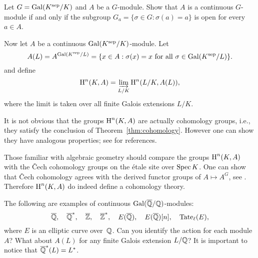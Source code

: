 \begin{exercise}
	Let $G = \operatorname{Gal}(K^{\operatorname{sep}}/K)$ and $A$ be a $G$-module.
	Show that $A$ is a continuous $G$-module
	if and only if the subgroup
	$G_a = \{\sigma \in G : \sigma(a) = a\}$ is open
	for every $a\in A$.
\end{exercise}

Now let $A$ be a continuous $\operatorname{Gal}(K^{\operatorname{sep}}/K)$-module. Let
$$
	A(L) = A^{\operatorname{Gal}(K^{\operatorname{sep}}/L)} = \{x \in A : \sigma(x) = x
	\text{ for all } \sigma \in\operatorname{Gal}(K^{\operatorname{sep}}/L)\}.
$$
and define
$$
	\operatorname{H}^n(K,A) = \varinjlim_{L/K} \operatorname{H}^n(L/K,A(L)),
$$
where the limit is taken over all finite Galois
extensions $L/K$.

It is not obvious that the groups $\operatorname{H}^n(K,A)$ are
actually cohomology groups, i.e., they satisfy the
conclusion of Theorem~\ref{thm:cohomology}. However
one can show they have analogous properties; see
\cite[Ch.~X.3]{serre:localfields} for references.

\begin{remark}
	Those familiar with algebraic geometry should
	compare the groups $\operatorname{H}^n(K,A)$ with the \v{C}ech
	cohomology groups on the \'{e}tale site over $\operatorname{Spec} K$.
	One can show that \v{C}ech cohomology
	agrees with the derived functor groups of
	$A\mapsto A^G$, see \cite[Ch.~10]{milne:etale}.
	Therefore $\operatorname{H}^n(K,A)$ do indeed define a cohomology
	theory.
\end{remark}

\begin{example}
The following are examples of continuous $\operatorname{Gal}(\overline{\mathbb{Q}}/\mathbb{Q})$-modules:
$$
	\overline{\mathbb{Q}},
	\quad \overline{\mathbb{Q}}^*,
	\quad \overline{\mathbb{Z}},
	\quad \overline{\mathbb{Z}}^*,
	\quad E(\overline{\mathbb{Q}}),
	\quad E(\overline{\mathbb{Q}})[n],
	\quad {\rm Tate}_{\ell}(E),
$$
where $E$ is an elliptic curve over~$\mathbb{Q}$. Can you identify the
action for each module $A$? What about $A(L)$ for any finite
Galois extension $L/\mathbb{Q}$? It is important to notice that
$\overline{\mathbb{Q}}^*(L) = L^*$.
\end{example}

